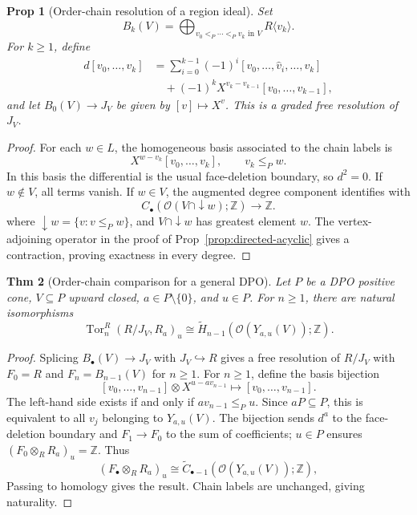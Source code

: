 \documentclass[10pt,letterpaper]{amsart}
\numberwithin{equation}{section}
\newtheorem{thm}{Thm}[section]
\newtheorem{prop}[thm]{Prop}
\theoremstyle{definition}
\newcommand{\Z}{\mathbb Z}
\newcommand{\Tor}{\operatorname{Tor}}
\newcommand{\ord}{\mathcal O}
\newcommand{\sh}[1]{\langle #1\rangle}
\begin{document}
\begin{prop}[Order-chain resolution of a region ideal]\label{prop:bar}
Set
\[
B_k(V)=\bigoplus_{v_0<_P\cdots<_Pv_k\text{ in }V}R\sh{v_k}.
\]
For $k\ge1$, define
\begin{align*}
d[v_0,\ldots,v_k]
&=\sum_{i=0}^{k-1}(-1)^i[v_0,\ldots,\widehat v_i,\ldots,v_k]\\
&\quad+(-1)^kX^{v_k-v_{k-1}}[v_0,\ldots,v_{k-1}],
\end{align*}
and let $B_0(V)\to J_V$ be given by $[v]\mapsto X^v$. This is a graded free resolution of $J_V$.
\end{prop}
\begin{proof}
For each $w\in L$, the homogeneous basis associated to the chain labels is
\[
X^{w-v_k}[v_0,\ldots,v_k],\qquad v_k\le_P w.
\]
In this basis the differential is the usual face-deletion boundary, so $d^2=0$. If $w\notin V$, all terms vanish. If $w\in V$, the augmented degree component identifies with
\[
C_\bullet(\ord(V\cap\downarrow w);\Z)\longrightarrow\Z.
\]
where $\downarrow w=\{v:v\le_Pw\}$, and $V\cap\downarrow w$ has greatest element $w$. The vertex-adjoining operator in the proof of Prop~\ref{prop:directed-acyclic} gives a contraction, proving exactness in every degree.
\end{proof}

\begin{thm}[Order-chain comparison for a general DPO]\label{thm:tor-order}
Let $P$ be a DPO positive cone, $V\subseteq P$ upward closed, $a\in P\setminus\{0\}$, and $u\in P$. For $n\ge1$, there are natural isomorphisms
\[
\Tor_n^R(R/J_V,R_a)_u
\cong\widetilde H_{n-1}(\ord(Y_{a,u}(V));\Z).
\]
\end{thm}
\begin{proof}
Splicing $B_\bullet(V)\to J_V$ with $J_V\hookrightarrow R$ gives a free resolution of $R/J_V$ with $F_0=R$ and $F_n=B_{n-1}(V)$ for $n\ge1$. For $n\ge1$, define the basis bijection
\[
[v_0,\ldots,v_{n-1}]\otimes X^{u-av_{n-1}}
\longmapsto[v_0,\ldots,v_{n-1}].
\]
The left-hand side exists if and only if $av_{n-1}\le_Pu$. Since $aP\subseteq P$, this is equivalent to all $v_j$ belonging to $Y_{a,u}(V)$. The bijection sends $d^a$ to the face-deletion boundary and $F_1\to F_0$ to the sum of coefficients; $u\in P$ ensures $(F_0\otimes_RR_a)_u=\Z$. Thus
\[
(F_\bullet\otimes_RR_a)_u\cong
\widetilde C_{\bullet-1}(\ord(Y_{a,u}(V));\Z),
\]
Passing to homology gives the result. Chain labels are unchanged, giving naturality.
\end{proof}
\end{document}
